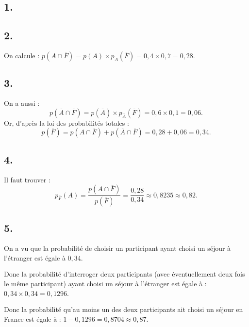 \subsection*{1.}

\begin{center}
\end{center}

\subsection*{2.}

On calcule : \(p(A \cap \overline{F}) = p(A) \times p_A(\overline{F}) = 0{,}4 \times 0{,}7 = 0{,}28\).

\subsection*{3.}

On a aussi :
\[
p(\overline{A} \cap \overline{F}) = p(\overline{A}) \times p_{\overline{A}}(\overline{F}) = 0{,}6 \times 0{,}1 = 0{,}06.
\]
Or, d'après la loi des probabilités totales :
\[
p(\overline{F}) = p(A \cap \overline{F}) + p(\overline{A} \cap \overline{F}) = 0{,}28 + 0{,}06 = 0{,}34.
\]

\subsection*{4.}

Il faut trouver :
\[
p_{\overline{F}}(A) = \dfrac{p(A \cap \overline{F})}{p(\overline{F})} = \dfrac{0{,}28}{0{,}34} \approx 0{,}8235 \approx 0{,}82.
\]

\subsection*{5.}

On a vu que la probabilité de choisir un participant ayant choisi un séjour à l'étranger est égale à \(0{,}34\).

Donc la probabilité d'interroger deux participants (avec éventuellement deux fois le même participant) ayant choisi un séjour à l'étranger est égale à : \(0{,}34 \times 0{,}34 = 0{,}1296\).

Donc la probabilité qu'au moins un des deux participants ait choisi un séjour en France est égale à : \(1 - 0{,}1296 = 0{,}8704 \approx 0{,}87\).
